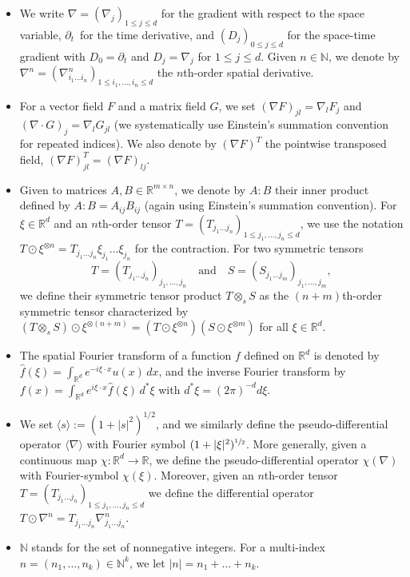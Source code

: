 \documentclass[10pt]{amsart}
\theoremstyle{plain}
\theoremstyle{definition}
\numberwithin{equation}{section}
\newcommand{\N}{\mathbb N}
\newcommand{\R}{\mathbb R}
\begin{document}
\begin{itemize}
\item We write $\nabla=(\nabla_j)_{1\le j\le d}$ for the gradient with respect to the space variable, $\partial_t$~for the time derivative, and $(D_j)_{0\le j\le d}$ for the space-time gradient with $D_0=\partial_t$ and $D_j=\nabla_j$ for $1\le j\le d$. {Given $n\in\N$, we denote by $\nabla^n=(\nabla^n_{i_1\ldots i_n})_{1\leq i_1,\ldots,i_n\leq d}$ the $n$th-order spatial derivative.}
\item For a vector field $F$ and a matrix field $G$, we set $(\nabla F)_{jl}=\nabla_lF_j$ and $(\nabla\cdot G)_j=\nabla_l G_{jl}$ (we systematically use Einstein's summation convention for repeated indices). {We also denote by $(\nabla F)^T$ the pointwise transpose{d} field, $(\nabla F)^T_{jl}=(\nabla F)_{lj}$.}
\item {Given to matrices $A,B\in\R^{m\times n}$, we denote by $A:B$ their inner product defined by $A:B=A_{ij}B_{ij}$ (again using Einstein's summation convention).}
For $\xi\in\R^d$ and an $n$th-order tensor $T=(T_{j_1\ldots j_n})_{1\le j_1,\ldots,j_n\le d}$, we use the notation \mbox{$T\odot \xi^{\otimes n}=T_{j_1\ldots j_n}\xi_{j_1}\ldots\xi_{j_n}$} for the contraction. For two symmetric tensors
\[
T=(T_{j_1\ldots j_n})_{ j_1,\ldots,j_n}\quad\text{and}\quad S=(S_{j_1\ldots j_m})_{j_1,\ldots,j_m},
\]
we define their symmetric \hbox{tensor} product $T\otimes_sS$ as the $(n+m)$th-order symmetric tensor characterized by $(T\otimes_sS)\odot \xi^{\otimes(n+m)}=(T\odot\xi^{\otimes n})(S\odot\xi^{\otimes m})$ for all $\xi\in\R^d$.
\item The spatial Fourier transform of a function $f$ defined on $\R^d$ is denoted by $\hat f(\xi)=\int_{\R^d}e^{-i\xi\cdot x}u(x)\,dx$, and the inverse Fourier transform by $f(x)=\int_{\R^d}e^{i\xi\cdot x}\hat f(\xi)\,d^*\xi$ with $d^*\xi=(2\pi)^{-d}d\xi$.
\item We set $\langle s \rangle:= (1+|s|^2)^{1/2}$, and we similarly {define the pseudo-differential operator $\langle\nabla\rangle$ with Fourier symbol $(1+|\xi|^2)^{\sfrac12}$}. {More generally, given a continuous map \hbox{$\chi:\R^d\to\R$}, we define the pseudo-differential operator $\chi(\nabla)$ with Fourier-symbol $\chi(\xi)$. Moreover, given an $n$th-order tensor $T=(T_{j_1\ldots j_n})_{1\leq j_1,\ldots,j_n\leq d}$ we define the differential operator $T\odot\nabla^n=T_{j_1\ldots j_n}\nabla^n_{j_1\ldots j_n}$.}
\item $\N$ stands for the set of nonnegative integers. For a multi-index $n=(n_1,\ldots,n_k)\in\N^k$, we let $|n|=n_1+\ldots+n_k$.

\end{itemize}
\end{document}
